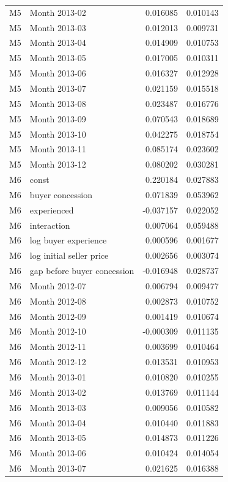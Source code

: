\documentclass[11pt,a4paper]{article}
\begin{document}
\begin{longtable}{lp{8.4cm}rr}
M5 & Month 2013-02 & 0.016085 & 0.010143 \\
M5 & Month 2013-03 & 0.012013 & 0.009731 \\
M5 & Month 2013-04 & 0.014909 & 0.010753 \\
M5 & Month 2013-05 & 0.017005 & 0.010311 \\
M5 & Month 2013-06 & 0.016327 & 0.012928 \\
M5 & Month 2013-07 & 0.021159 & 0.015518 \\
M5 & Month 2013-08 & 0.023487 & 0.016776 \\
M5 & Month 2013-09 & 0.070543 & 0.018689 \\
M5 & Month 2013-10 & 0.042275 & 0.018754 \\
M5 & Month 2013-11 & 0.085174 & 0.023602 \\
M5 & Month 2013-12 & 0.080202 & 0.030281 \\
M6 & const & 0.220184 & 0.027883 \\
M6 & buyer concession & 0.071839 & 0.053962 \\
M6 & experienced & -0.037157 & 0.022052 \\
M6 & interaction & 0.007064 & 0.059488 \\
M6 & log buyer experience & 0.000596 & 0.001677 \\
M6 & log initial seller price & 0.002656 & 0.003074 \\
M6 & gap before buyer concession & -0.016948 & 0.028737 \\
M6 & Month 2012-07 & 0.006794 & 0.009477 \\
M6 & Month 2012-08 & 0.002873 & 0.010752 \\
M6 & Month 2012-09 & 0.001419 & 0.010674 \\
M6 & Month 2012-10 & -0.000309 & 0.011135 \\
M6 & Month 2012-11 & 0.003699 & 0.010464 \\
M6 & Month 2012-12 & 0.013531 & 0.010953 \\
M6 & Month 2013-01 & 0.010820 & 0.010255 \\
M6 & Month 2013-02 & 0.013769 & 0.011144 \\
M6 & Month 2013-03 & 0.009056 & 0.010582 \\
M6 & Month 2013-04 & 0.010440 & 0.011883 \\
M6 & Month 2013-05 & 0.014873 & 0.011226 \\
M6 & Month 2013-06 & 0.010424 & 0.014054 \\
M6 & Month 2013-07 & 0.021625 & 0.016388 \\

\end{longtable}
\end{document}
